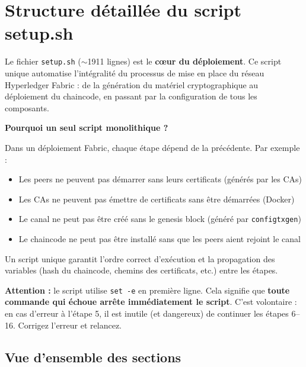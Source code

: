 \documentclass[12pt,a4paper,twoside]{report}
\begin{document}
\chapter{Structure détaillée du script setup.sh}

Le fichier \texttt{setup.sh} ($\sim$1911 lignes) est le \textbf{cœur du déploiement}. Ce script unique automatise l'intégralité du processus de mise en place du réseau Hyperledger Fabric : de la génération du matériel cryptographique au déploiement du chaincode, en passant par la configuration de tous les composants.

\begin{infobox}
\textbf{Pourquoi un seul script monolithique ?}

Dans un déploiement Fabric, chaque étape dépend de la précédente. Par exemple :
\begin{itemize}
    \item Les peers ne peuvent pas démarrer sans leurs certificats (générés par les CAs)
    \item Les CAs ne peuvent pas émettre de certificats sans être démarrées (Docker)
    \item Le canal ne peut pas être créé sans le genesis block (généré par \texttt{configtxgen})
    \item Le chaincode ne peut pas être installé sans que les peers aient rejoint le canal
\end{itemize}
Un script unique garantit l'ordre correct d'exécution et la propagation des variables (hash du chaincode, chemins des certificats, etc.) entre les étapes.
\end{infobox}

\begin{dangerbox}
\textbf{Attention :} le script utilise \texttt{set -e} en première ligne. Cela signifie que \textbf{toute commande qui échoue arrête immédiatement le script}. C'est volontaire : en cas d'erreur à l'étape 5, il est inutile (et dangereux) de continuer les étapes 6--16. Corrigez l'erreur et relancez.
\end{dangerbox}

\section{Vue d'ensemble des sections}
\end{document}
